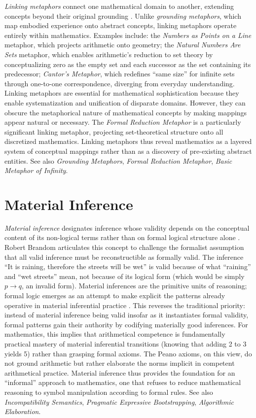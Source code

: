 \documentclass{book}
\begin{document}
\textit{Linking metaphors} connect one mathematical domain to another, extending concepts beyond their original grounding \parencite{Lakoff2000}. Unlike \textit{grounding metaphors}, which map embodied experience onto abstract concepts, linking metaphors operate entirely within mathematics. Examples include: the \textit{Numbers as Points on a Line} metaphor, which projects arithmetic onto geometry; the \textit{Natural Numbers Are Sets} metaphor, which enables arithmetic's reduction to set theory by conceptualizing zero as the empty set and each successor as the set containing its predecessor; \textit{Cantor's Metaphor}, which redefines ``same size'' for infinite sets through one-to-one correspondence, diverging from everyday understanding. Linking metaphors are essential for mathematical sophistication because they enable systematization and unification of disparate domains. However, they can obscure the metaphorical nature of mathematical concepts by making mappings appear natural or necessary. The \textit{Formal Reduction Metaphor} is a particularly significant linking metaphor, projecting set-theoretical structure onto all discretized mathematics. Linking metaphors thus reveal mathematics as a layered system of conceptual mappings rather than as a discovery of pre-existing abstract entities. See also \textit{Grounding Metaphors}, \textit{Formal Reduction Metaphor}, \textit{Basic Metaphor of Infinity}.

\section{Material Inference}

\textit{Material inference} designates inference whose validity depends on the conceptual content of its non-logical terms rather than on formal logical structure alone \parencite{brandom1994making, Brandom2000}. Robert Brandom articulates this concept to challenge the formalist assumption that all valid inference must be reconstructible as formally valid. The inference ``It is raining, therefore the streets will be wet'' is valid because of what ``raining'' and ``wet streets'' mean, not because of its logical form (which would be simply $p \to q$, an invalid form). Material inferences are the primitive units of reasoning; formal logic emerges as an attempt to make explicit the patterns already operative in material inferential practice \parencite{brandom1994making}. This reverses the traditional priority: instead of material inference being valid insofar as it instantiates formal validity, formal patterns gain their authority by codifying materially good inferences. For mathematics, this implies that arithmetical competence is fundamentally practical mastery of material inferential transitions (knowing that adding 2 to 3 yields 5) rather than grasping formal axioms. The Peano axioms, on this view, do not ground arithmetic but rather elaborate the norms implicit in competent arithmetical practice. Material inference thus provides the foundation for an ``informal'' approach to mathematics, one that refuses to reduce mathematical reasoning to symbol manipulation according to formal rules. See also \textit{Incompatibility Semantics}, \textit{Pragmatic Expressive Bootstrapping}, \textit{Algorithmic Elaboration}.
\end{document}

